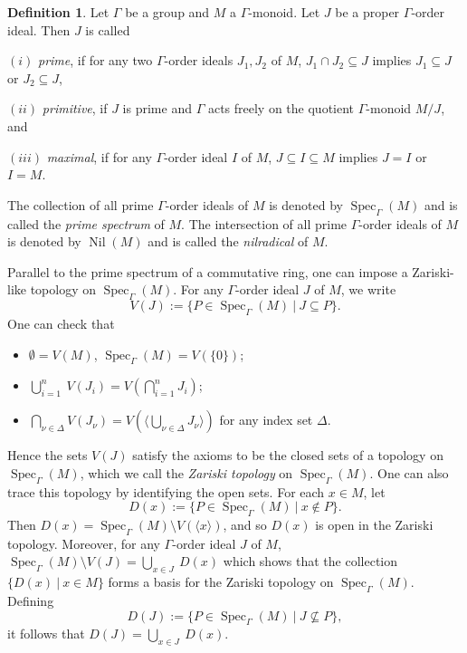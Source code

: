\documentclass[a4paper,reqno,12pt]{amsart}
\numberwithin{equation}{section}
\theoremstyle{definition}
\newtheorem{dfn}[thm]{Definition}
\theoremstyle{remark}
\newcommand{\nil}{\operatorname{Nil}}
\newcommand{\Spec}{\operatorname{Spec}}
\begin{document}
\begin{dfn}\label{def prime, primitive and maximal}
Let $\Gamma$ be a group and $M$ a $\Gamma$-monoid. Let $J$ be a proper $\Gamma$-order ideal. Then $J$ is called 

$(i)$ \emph{prime}, if for any two $\Gamma$-order ideals $J_1,J_2$ of $M$, $J_1\cap J_2\subseteq J$ implies $J_1\subseteq J$ or $J_2\subseteq J$,

$(ii)$ \emph{primitive}, if $J$ is prime and $\Gamma$ acts freely on the quotient $\Gamma$-monoid $M/{J}$, and 

$(iii)$ \emph{maximal}, if for any $\Gamma$-order ideal $I$ of $M$, $J\subseteq I\subseteq M$ implies $J=I$ or $I=M$. 
\end{dfn}   

The collection of all prime $\Gamma$-order ideals of $M$ is denoted by $\Spec_\Gamma(M)$ and is called the \emph{prime spectrum} of $M$. The intersection of all prime $\Gamma$-order ideals of $M$ is denoted by $\nil(M)$ and is called the \emph{nilradical} of $M$. 

Parallel to the prime spectrum of a commutative ring, one can impose a Zariski-like topology on $\Spec_\Gamma(M)$. For any $\Gamma$-order ideal $J$ of $M$, we write \[V(J):=\{P\in \Spec_\Gamma(M)~|~J\subseteq P\}.\] One can check that 

\begin{itemize}
\item $\emptyset=V(M)$, $\Spec_\Gamma(M)=V(\{0\})$;

\item $\displaystyle{\bigcup_{i=1}^{n}}~V(J_i)=V\left(\displaystyle{\bigcap_{i=1}^{n}}J_i\right)$;

\item $\displaystyle{\bigcap_{\nu\in \Delta}} V(J_\nu)=V\left(\langle \displaystyle{\bigcup_{\nu\in \Delta}}J_\nu\rangle \right)$ for any index set $\Delta$.
\end{itemize}

Hence the sets $V(J)$ satisfy the axioms to be the closed sets of a topology on $\Spec_\Gamma(M)$, which we call the \emph{Zariski topology} on $\Spec_\Gamma(M)$. One can also trace this topology by identifying the open sets. For each $x\in M$, let \[D(x):=\{P\in \Spec_\Gamma(M)~|~x\notin P\}.\] Then $D(x)=\Spec_\Gamma(M)\setminus V(\langle x\rangle)$, and so $D(x)$ is open in the Zariski topology. Moreover, for any $\Gamma$-order ideal $J$ of $M$, $\Spec_\Gamma(M)\setminus V(J)=\displaystyle{\bigcup_{x\in J}}~D(x)$ which shows that the collection $\{D(x)~|~x\in M\}$ forms a basis for the Zariski topology on $\Spec_\Gamma(M)$. Defining \[D(J):=\{P\in \Spec_\Gamma(M)~|~J\nsubseteq P\},\] it follows that $D(J)=\displaystyle{\bigcup_{x\in J}}~D(x)$. 
\end{document}
